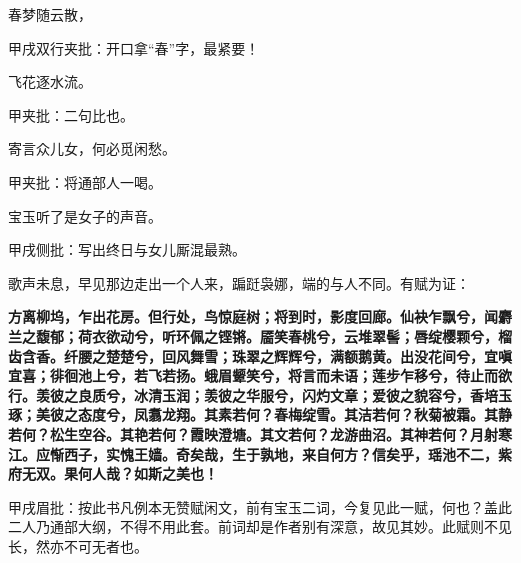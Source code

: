 \begin{poem}
    \begin{pl}春梦随云散，\end{pl}
    \begin{note}甲戌双行夹批：开口拿“春”字，最紧要！\end{note}

    \begin{pl}飞花逐水流。\end{pl}\begin{note}甲夹批：二句比也。\end{note}

    \begin{pl}寄言众儿女，何必觅闲愁。\end{pl}
    \begin{note}甲夹批：将通部人一喝。\end{note}
\end{poem}


\begin{parag}
    宝玉听了是女子的声音。\begin{note}甲戌侧批：写出终日与女儿厮混最熟。\end{note}歌声未息，早见那边走出一个人来，蹁跹袅娜，端的与人不同。有赋为证：
\end{parag}
\begin{qute2sp}
    \textbf{
        方离柳坞，乍出花房。但行处，鸟惊庭树；将到时，影度回廊。仙袂乍飘兮，闻麝兰之馥郁；荷衣欲动兮，听环佩之铿锵。靥笑春桃兮，云堆翠髻；唇绽樱颗兮，榴齿含香。纤腰之楚楚兮，回风舞雪；珠翠之辉辉兮，满额鹅黄。出没花间兮，宜嗔宜喜；徘徊池上兮，若飞若扬。蛾眉颦笑兮，将言而未语；莲步乍移兮，待止而欲行。羡彼之良质兮，冰清玉润；羡彼之华服兮，闪灼文章；爱彼之貌容兮，香培玉琢；美彼之态度兮，凤翥龙翔。其素若何？春梅绽雪。其洁若何？秋菊被霜。其静若何？松生空谷。其艳若何？霞映澄塘。其文若何？龙游曲沼。其神若何？月射寒江。应惭西子，实愧王嫱。奇矣哉，生于孰地，来自何方？信矣乎，瑶池不二，紫府无双。果何人哉？如斯之美也！}
    \begin{note}甲戌眉批：按此书凡例本无赞赋闲文，前有宝玉二词，今复见此一赋，何也？盖此二人乃通部大纲，不得不用此套。前词却是作者别有深意，故见其妙。此赋则不见长，然亦不可无者也。\end{note}

\end{qute2sp}



